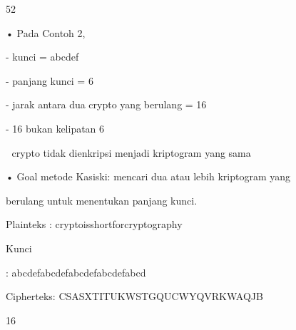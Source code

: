 \documentclass{article}
\begin{document}

52

• Pada Contoh 2,


- kunci = abcdef 


- panjang kunci = 6


- jarak antara dua crypto yang berulang = 16


- 16 bukan kelipatan 6

 crypto tidak dienkripsi menjadi kriptogram yang sama

• Goal metode Kasiski: mencari dua atau lebih kriptogram yang 

berulang untuk menentukan panjang kunci.

Plainteks   : cryptoisshortforcryptography

Kunci  

   : abcdefabcdefabcdefabcdefabcd

Cipherteks: CSASXTITUKWSTGQUCWYQVRKWAQJB

16
\end{document}
